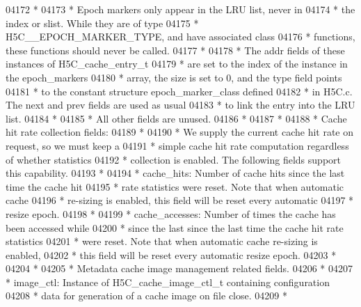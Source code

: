 \begin{DoxyCode}
04172 \textcolor{comment}{ *}
04173 \textcolor{comment}{ *      Epoch markers only appear in the LRU list, never in}
04174 \textcolor{comment}{ *      the index or slist.  While they are of type}
04175 \textcolor{comment}{ *      H5C\_\_EPOCH\_MARKER\_TYPE, and have associated class}
04176 \textcolor{comment}{ *      functions, these functions should never be called.}
04177 \textcolor{comment}{ *}
04178 \textcolor{comment}{ *      The addr fields of these instances of H5C\_cache\_entry\_t}
04179 \textcolor{comment}{ *      are set to the index of the instance in the epoch\_markers}
04180 \textcolor{comment}{ *      array, the size is set to 0, and the type field points}
04181 \textcolor{comment}{ *      to the constant structure epoch\_marker\_class defined}
04182 \textcolor{comment}{ *      in H5C.c.  The next and prev fields are used as usual}
04183 \textcolor{comment}{ *      to link the entry into the LRU list.}
04184 \textcolor{comment}{ *}
04185 \textcolor{comment}{ *      All other fields are unused.}
04186 \textcolor{comment}{ *}
04187 \textcolor{comment}{ *}
04188 \textcolor{comment}{ * Cache hit rate collection fields:}
04189 \textcolor{comment}{ *}
04190 \textcolor{comment}{ * We supply the current cache hit rate on request, so we must keep a}
04191 \textcolor{comment}{ * simple cache hit rate computation regardless of whether statistics}
04192 \textcolor{comment}{ * collection is enabled.  The following fields support this capability.}
04193 \textcolor{comment}{ *}
04194 \textcolor{comment}{ * cache\_hits: Number of cache hits since the last time the cache hit}
04195 \textcolor{comment}{ *  rate statistics were reset.  Note that when automatic cache}
04196 \textcolor{comment}{ *  re-sizing is enabled, this field will be reset every automatic}
04197 \textcolor{comment}{ *  resize epoch.}
04198 \textcolor{comment}{ *}
04199 \textcolor{comment}{ * cache\_accesses: Number of times the cache has been accessed while}
04200 \textcolor{comment}{ *  since the last since the last time the cache hit rate statistics}
04201 \textcolor{comment}{ *  were reset.  Note that when automatic cache re-sizing is enabled,}
04202 \textcolor{comment}{ *  this field will be reset every automatic resize epoch.}
04203 \textcolor{comment}{ *}
04204 \textcolor{comment}{ *}
04205 \textcolor{comment}{ * Metadata cache image management related fields.}
04206 \textcolor{comment}{ *}
04207 \textcolor{comment}{ * image\_ctl:   Instance of H5C\_cache\_image\_ctl\_t containing configuration}
04208 \textcolor{comment}{ *      data for generation of a cache image on file close.}
04209 \textcolor{comment}{ *}

\end{DoxyCode}
